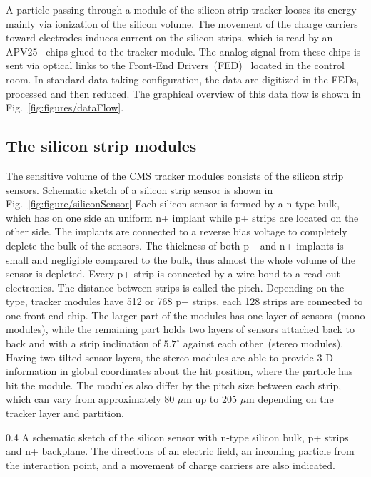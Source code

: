 A particle passing through a module of the silicon strip tracker looses its energy mainly via ionization of the silicon volume. The movement of the charge carriers toward electrodes induces current on the silicon strips, which is read by an APV25~\cite{French:2001xb} chips glued to the tracker module. The analog signal from these chips is sent via optical links to the Front-End Drivers~(FED)~\cite{Baird:2002wg} located in the control room. In standard data-taking configuration, the data are digitized in the FEDs, processed and then reduced. The graphical overview of this data flow is shown in Fig.~\ref{fig:figures/dataFlow}.

\subsection{The silicon strip modules}


The sensitive volume of the CMS tracker modules consists of the silicon strip sensors. Schematic sketch of a silicon strip sensor is shown in Fig.~\ref{fig:figure/siliconSensor} Each silicon sensor is formed by a n-type bulk, which has on one side an uniform n+ implant while p+ strips are located on the other side. The implants are connected to a reverse bias voltage to completely deplete the bulk of the sensors. The thickness of both p+ and n+ implants is small and negligible compared to the bulk, thus almost the whole volume of the sensor is depleted. Every p+ strip is connected by a wire bond to a read-out electronics. The distance between strips is called the pitch. Depending on the type, tracker modules have 512 or 768 p+ strips, each 128 strips are connected to one front-end chip. The larger part of the modules has one layer of sensors~(mono modules), while the remaining part holds two layers of sensors attached back to back and with a strip inclination of $5.7^{\circ}$ against each other~(stereo modules). Having two tilted sensor layers, the stereo modules are able to provide 3-D information in global coordinates about the hit position, where the particle has hit the module. The modules also differ by the pitch size between each strip, which can vary from approximately 80 $\mu$m up to 205 $\mu$m depending on the tracker layer and partition.

                 {0.4}       %
                 {A schematic sketch of the silicon sensor with n-type silicon bulk, p+ strips and n+ backplane. The directions of an electric field, an incoming particle from the interaction point, and a movement of charge carriers are also indicated. } %

